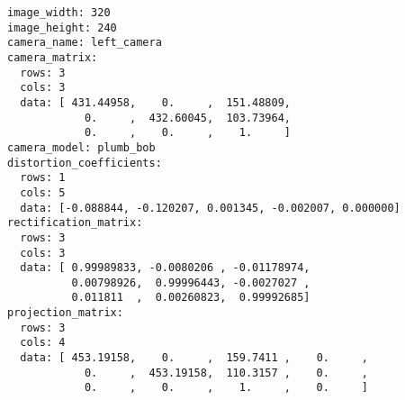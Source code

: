 \begin{lstlisting}[caption=YAML de la calibración de la cámara izquierda mediante ROS, label=lst:leftcamerayaml]
image_width: 320
image_height: 240
camera_name: left_camera
camera_matrix:
  rows: 3
  cols: 3
  data: [ 431.44958,    0.     ,  151.48809,
            0.     ,  432.60045,  103.73964,
            0.     ,    0.     ,    1.     ]
camera_model: plumb_bob
distortion_coefficients:
  rows: 1
  cols: 5
  data: [-0.088844, -0.120207, 0.001345, -0.002007, 0.000000]
rectification_matrix:
  rows: 3
  cols: 3
  data: [ 0.99989833, -0.0080206 , -0.01178974,
          0.00798926,  0.99996443, -0.0027027 ,
          0.011811  ,  0.00260823,  0.99992685]
projection_matrix:
  rows: 3
  cols: 4
  data: [ 453.19158,    0.     ,  159.7411 ,    0.     ,
            0.     ,  453.19158,  110.3157 ,    0.     ,
            0.     ,    0.     ,    1.     ,    0.     ]
\end{lstlisting}